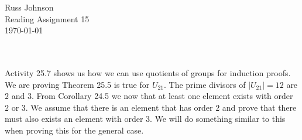 \documentclass[11pt,a4paper]{article}
\begin{document}
\begin{flushright}
Russ Johnson\\
Reading Assignment 15\\
\today\\
\end{flushright}
~\\
~\\
Activity 25.7 shows us how we can use quotients of groups for induction proofs.  We are proving Theorem 25.5 is true for $U_{21}$. The prime divisors of $|U_{21}| = 12$ are $2$ and $3$. From Corollary 24.5 we now that at least one element exists with order $2$ or $3$. We assume that there is an element that has order $2$ and prove that there must also exists an element with order $3$. We will do something similar to this when proving this for the general case.
\end{document}
